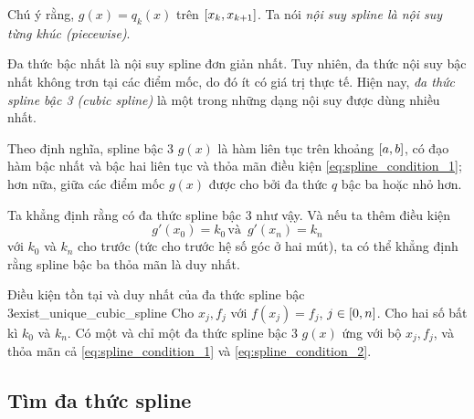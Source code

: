\documentclass[../../Lectures]{subfiles}
\begin{document}
Chú ý rằng, \(g(x) = q_k(x)\) trên \(\interval{x_k}{x_{k + 1}}\). Ta nói
\emph{nội suy spline là nội suy từng khúc (piecewise)}.

Đa thức bậc nhất là nội suy spline đơn giản nhất. Tuy nhiên, đa thức nội suy bậc
nhất không trơn tại các điểm mốc, do đó ít có giá trị thực tế. Hiện nay,
\emph{đa thức spline bậc 3 (cubic spline)} là một trong những dạng nội suy được
dùng nhiều nhất.

Theo định nghĩa, spline bậc 3 \(g(x)\) là hàm liên tục trên khoảng
\(\interval{a}{b}\), có đạo hàm bậc nhất và bậc hai liên tục và thỏa mãn điều
kiện \eqref{eq:spline_condition_1}; hơn nữa, giữa các điểm mốc \(g(x)\) được cho
bởi đa thức \(q\) bậc ba hoặc nhỏ hơn.

Ta khẳng định rằng có đa thức spline bậc 3 như vậy. Và nếu ta thêm điều kiện
\begin{equation}\label{eq:spline_condition_2}
    g'(x_0) = k_0 \, \text{và } \, g'(x_n) = k_n
\end{equation}
với \(k_0\) và \(k_n\) cho trước (tức cho trước hệ số góc ở hai mút), ta có thể
khẳng định rằng spline bậc ba thỏa mãn là duy nhất.

\begin{ctheorem}{Điều kiện tồn tại và duy nhất của đa thức spline bậc 3}{exist_unique_cubic_spline}
    Cho \(x_j, f_j\) với \(f(x_j) = f_j\), \(j \in \interval{0}{n}\). Cho hai số
    bất kì \(k_0\) và \(k_n\). Có một và chỉ một đa thức spline bậc 3 \(g(x)\)
    ứng với bộ \(x_j, f_j\), và thỏa mãn cả \eqref{eq:spline_condition_1} và
    \eqref{eq:spline_condition_2}.
\end{ctheorem}

\subsection{Tìm đa thức spline}
\end{document}

